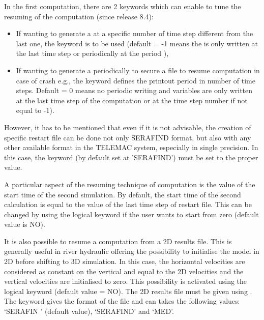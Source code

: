 In the first computation, there are 2 keywords which can enable to tune the
resuming of the computation (since release 8.4):
\begin{itemize}
\item If wanting to generate a  at a specific number of
time step different from the last one, the keyword
 is to be used
(default = -1 means the  is only written at the last
time step or periodically at the period ),
\item If wanting to generate a  periodically to secure a
file to resume computation in case of crash e.g., the keyword
 defines the printout period in number of
time steps.
Default = 0 means no periodic writing and variables are only written at the last
time step of the computation or at the time step number
 if not equal to -1).
\end{itemize}

However, it has to be mentioned that even if it is not advisable, the creation
of specific restart file can be done not only SERAFIND format, but also with
any other available format in the TELEMAC system, especially in single
precision. In this case, the keyword  (by default
set at 'SERAFIND') must be set to the proper value.

A particular aspect of the resuming technique of computation is the value of
the start time of the second simulation. By default, the start time of the
second calculation is equal to the value of the last time step of restart file.
This can be changed by using the logical keyword  if the user wants to start from zero (default value is NO).

It is also possible to resume a computation from a 2D results file. This is
generally useful in river hydraulic offering the possibility to initialise the
model in 2D before shifting to 3D simulation. In this case, the horizontal
velocities are considered as constant on the vertical and equal to the 2D
velocities and the vertical velocities are initialised to zero. This
possibility is activated using the  logical keyword
(default value = NO). The 2D results file must be given using . The keyword  gives
the format of the file and can takes the following values: `SERAFIN ' (default
value), `SERAFIND' and `MED'.


